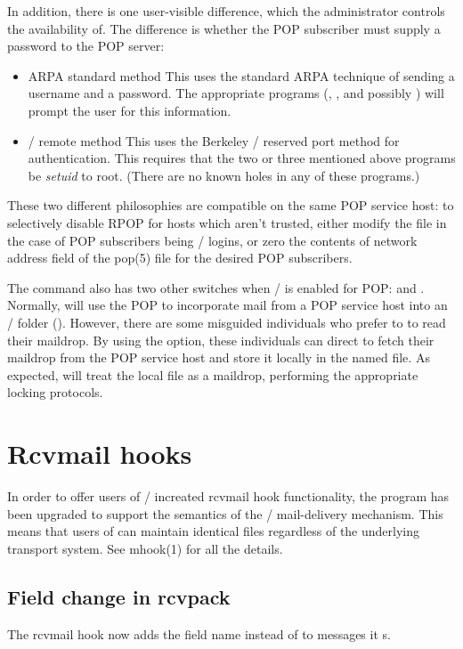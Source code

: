In addition, there is one user-visible difference,
which the administrator controls the availability of.
The difference is whether the POP subscriber must supply a password to the POP
server:
\begin{itemize}
\item	ARPA standard method\hbreak
This uses the standard ARPA technique of sending a username and a password.
The appropriate programs (, , and possibly )
will prompt the user for this information.

\item	\unix/ remote method\hbreak
This uses the Berkeley \unix/ reserved port method for authentication.
This requires that the two or three mentioned above programs be {\em setuid\/}
to root.
(There are no known holes in any of these programs.)
\end{itemize}
These two different philosophies are compatible on the same POP service host:
to selectively disable RPOP for hosts which aren't trusted,
either modify the  file in the case of POP subscribers being
\unix/ logins,
or zero the contents of network address field of the \man pop(5) file for the
desired POP subscribers.

The  command also has two other switches when \MH/ is enabled for
POP:
 and .
Normally,
 will use the POP to incorporate mail from a POP service host into
an \MH/ folder ().
However,
there are some misguided individuals who prefer to  to read their
maildrop.
By using the  option,
these individuals can direct  to fetch their maildrop from the POP
service host and store it locally in the named file.
As expected,  will treat the local file as a maildrop,
performing the appropriate locking protocols.

\section*	{Rcvmail hooks}
In order to offer users of \MH/ increated rcvmail hook functionality,
the  program has been upgraded to support the semantics of
the \MMDFII/ mail-delivery mechanism.
This means that users of  can maintain identical 
files regardless of the underlying transport system.
See \man mhook(1) for all the details.

\subsection*	{Field change in rcvpack}
The  rcvmail hook now adds the field name 
instead of  to messages it s.

